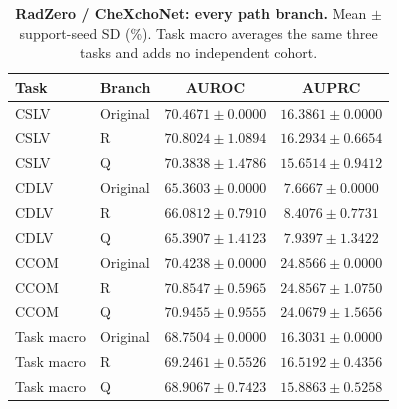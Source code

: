 \begin{table}[tp]
\centering
\caption{\textbf{RadZero / CheXchoNet: every path branch.} Mean $\pm$ support-seed SD (\%). Task macro averages the same three tasks and adds no independent cohort.}
\label{tab:supp-cardiac-path-radzero}
\small
\setlength{\tabcolsep}{4pt}
\begin{tabular*}{\textwidth}{@{\extracolsep{\fill}}llcc@{}}
\toprule
Task & Branch & AUROC & AUPRC \\
\midrule
CSLV & Original & $70.4671\pm0.0000$ & $16.3861\pm0.0000$ \\
CSLV & R & $70.8024\pm1.0894$ & $16.2934\pm0.6654$ \\
CSLV & Q & $70.3838\pm1.4786$ & $15.6514\pm0.9412$ \\
CDLV & Original & $65.3603\pm0.0000$ & $7.6667\pm0.0000$ \\
CDLV & R & $66.0812\pm0.7910$ & $8.4076\pm0.7731$ \\
CDLV & Q & $65.3907\pm1.4123$ & $7.9397\pm1.3422$ \\
CCOM & Original & $70.4238\pm0.0000$ & $24.8566\pm0.0000$ \\
CCOM & R & $70.8547\pm0.5965$ & $24.8567\pm1.0750$ \\
CCOM & Q & $70.9455\pm0.9555$ & $24.0679\pm1.5656$ \\
Task macro & Original & $68.7504\pm0.0000$ & $16.3031\pm0.0000$ \\
Task macro & R & $69.2461\pm0.5526$ & $16.5192\pm0.4356$ \\
Task macro & Q & $68.9067\pm0.7423$ & $15.8863\pm0.5258$ \\
\bottomrule
\end{tabular*}
\end{table}

